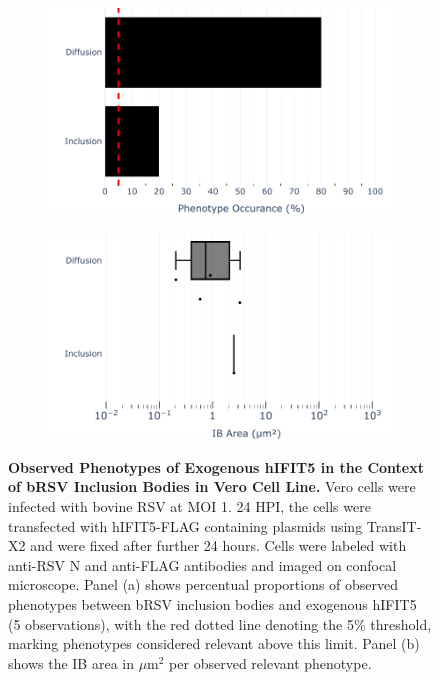 \begin{figure}
    \begin{subfigure}{0.495\textwidth}
        \caption{}
        \includegraphics[width=1\linewidth]{09. Chapter 4/Figs/02. Overexpression/04. IFIT5/04. bar_i5_brsv.pdf} 
    \end{subfigure}
    \begin{subfigure}{0.495\textwidth}
        \caption{}
        \includegraphics[width=1\linewidth]{09. Chapter 4/Figs/02. Overexpression/04. IFIT5/05. box_i5_brsv.pdf}
    \end{subfigure}
    \caption[Observed Phenotypes of Exogenous hIFIT5 in the Context of bRSV Inclusion Bodies in Vero Cell Line.]{\textbf{Observed Phenotypes of Exogenous hIFIT5 in the Context of bRSV Inclusion Bodies in Vero Cell Line.} Vero cells were infected with bovine RSV at MOI 1. 24 HPI, the cells were transfected with hIFIT5-FLAG containing plasmids using TransIT-X2 and were fixed after further 24 hours. Cells were labeled with anti-RSV N and anti-FLAG antibodies and imaged on confocal microscope. Panel (a) shows percentual proportions of observed phenotypes between bRSV inclusion bodies and exogenous hIFIT5 (5 observations), with the red dotted line denoting the 5\% threshold, marking phenotypes considered relevant above this limit. Panel (b) shows the IB area in \(\mu \mbox{m}^2\) per observed relevant phenotype.}
    \label{fig:Observed Phenotypes of Exogenous hIFIT5 in the Context of bRSV Inclusion Bodies in VERO Cell Line}
\end{figure}

